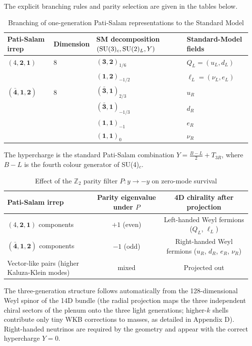 \documentclass[11pt,a4paper,oneside]{article}
\begin{document}
The explicit branching rules and parity selection are given in the tables below.

\begin{table}[htbp]
\centering
\caption{Branching of one-generation Pati-Salam representations to the Standard Model}
\label{tab:ps-branching}
\begin{tabular}{l l l l}
\toprule
Pati-Salam irrep & Dimension & SM decomposition \(({\rm SU}(3)_{c}, {\rm SU}(2)_{L}, Y)\) & Standard-Model fields \\
\midrule
\((4,\mathbf{2},\mathbf{1})\) & 8 & \((\mathbf{3},\mathbf{2})_{1/6}\) & \(Q_L = (u_L,d_L)\) \\
& & \((\mathbf{1},\mathbf{2})_{-1/2}\) & \(\ell_L = (\nu_L,e_L)\) \\
\((\bar{\mathbf{4}},\mathbf{1},\mathbf{2})\) & 8 & \((\bar{\mathbf{3}},\mathbf{1})_{2/3}\) & \(u_R\) \\
& & \((\bar{\mathbf{3}},\mathbf{1})_{-1/3}\) & \(d_R\) \\
& & \((\mathbf{1},\mathbf{1})_{-1}\) & \(e_R\) \\
& & \((\mathbf{1},\mathbf{1})_{0}\) & \(\nu_R\) \\
\bottomrule
\end{tabular}
\end{table}

The hypercharge is the standard Pati-Salam combination \(Y = \frac{B-L}{2} + T_{3R}\), where \(B-L\) is the fourth colour generator of SU(4)\(_c\).

\begin{table}[htbp]
\centering
\caption{Effect of the \(\mathbb{Z}_2\) parity filter \(P: y\to -y\) on zero-mode survival}
\label{tab:parity-filter}
\begin{tabular}{l c c}
\toprule
Pati-Salam irrep & Parity eigenvalue under \(P\) & 4D chirality after projection \\
\midrule
\((4,\mathbf{2},\mathbf{1})\) components & \(+1\) (even) & Left-handed Weyl fermions (\(Q_L\), \(\ell_L\)) \\
\((\bar{\mathbf{4}},\mathbf{1},\mathbf{2})\) components & \(-1\) (odd) & Right-handed Weyl fermions (\(u_R\), \(d_R\), \(e_R\), \(\nu_R\)) \\
Vector-like pairs (higher Kaluza-Klein modes) & mixed & Projected out \\
\bottomrule
\end{tabular}
\end{table}

The three-generation structure follows automatically from the 128-dimensional Weyl spinor of the 14D bundle (the radial projection maps the three independent chiral sectors of the plenum onto the three light generations; higher-\(k\) shells contribute only tiny WKB corrections to masses, as detailed in Appendix D). Right-handed neutrinos are required by the geometry and appear with the correct hypercharge \(Y=0\).
\end{document}
